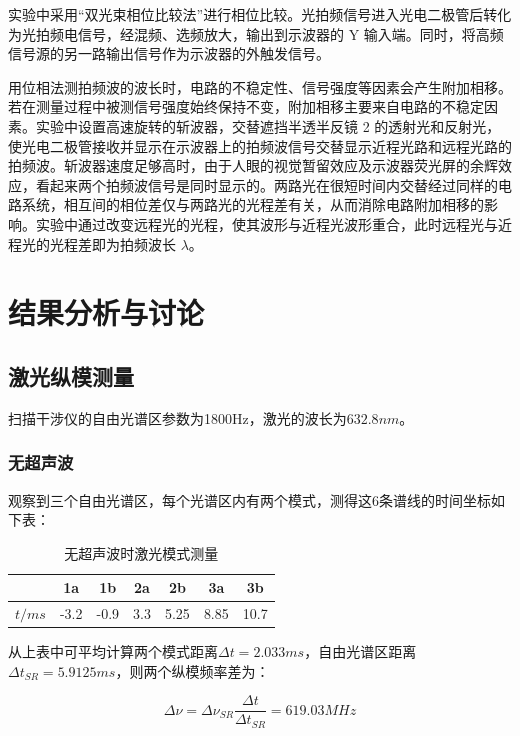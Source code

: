 \documentclass[12pt,a4paper]{article}
\newcommand{\be}[1]{
    \begin{equation}
        #1
    \end{equation}
}
\begin{document}
实验中采用“双光束相位比较法”进行相位比较。光拍频信号进入光电二极管后转化为光拍频电信号，经混频、选频放大，输出到示波器的 Y 输入端。同时，将高频信号源的另一路输出信号作为示波器的外触发信号。

用位相法测拍频波的波长时，电路的不稳定性、信号强度等因素会产生附加相移。若在测量过程中被测信号强度始终保持不变，附加相移主要来自电路的不稳定因素。实验中设置高速旋转的斩波器，交替遮挡半透半反镜 2 的透射光和反射光，使光电二极管接收并显示在示波器上的拍频波信号交替显示近程光路和远程光路的拍频波。斩波器速度足够高时，由于人眼的视觉暂留效应及示波器荧光屏的余辉效应，看起来两个拍频波信号是同时显示的。两路光在很短时间内交替经过同样的电路系统，相互间的相位差仅与两路光的光程差有关，从而消除电路附加相移的影响。实验中通过改变远程光的光程，使其波形与近程光波形重合，此时远程光与近程光的光程差即为拍频波长 $\lambda$。

\section{结果分析与讨论}
\subsection{激光纵模测量}
扫描干涉仪的自由光谱区参数为1800Hz，激光的波长为$632.8nm$。
\subsubsection{无超声波}
观察到三个自由光谱区，每个光谱区内有两个模式，测得这6条谱线的时间坐标如下表：
\begin{table}[H]
    \centering
    \begin{tabular}{|c|c|c|c|c|c|c|}
    \hline
      & 1a   & 1b   & 2a  & 2b   & 3a   & 3b   \\ \hline
    $t/ms$ & -3.2 & -0.9 & 3.3 & 5.25 & 8.85 & 10.7 \\ \hline
    \end{tabular}
    \caption{无超声波时激光模式测量}
    \end{table}
从上表中可平均计算两个模式距离$\Delta t=2.033ms$，自由光谱区距离$\Delta t_{SR}=5.9125ms$，则两个纵模频率差为：
\be{\Delta \nu=\Delta \nu_{SR}\frac{\Delta t}{\Delta t_{SR}}=619.03MHz}
\end{document}
